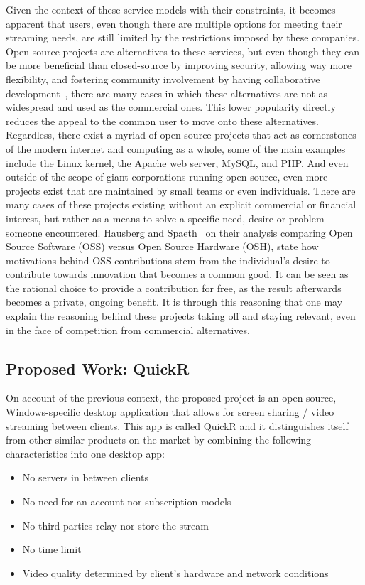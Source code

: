 \documentclass{article}
\begin{document}
Given the context of these service models with their constraints, it becomes apparent that users, even though there are multiple options for meeting their streaming needs, are still limited by the restrictions imposed
by these companies. Open source projects are alternatives to these services, but even though they can be more beneficial than closed-source by improving security, allowing way more flexibility, and fostering
community involvement by having collaborative development~\cite{open_source_benefits}, there are many cases in which these alternatives are not as widespread and used as the commercial ones. This lower popularity directly reduces the appeal to the 
common user to move onto these alternatives. Regardless, there exist a myriad of open source projects that act as cornerstones of the modern internet and computing as a whole, some of the main examples include the Linux kernel, the Apache web server, MySQL, and PHP.  And even outside of the scope of giant corporations running open source, even more projects exist that are maintained by small teams or even individuals.
There are many cases of these projects existing without an explicit commercial or financial interest, but rather as a means to solve a specific need, desire or problem someone encountered. Hausberg and Spaeth~\cite{hausberg2020open} on their analysis comparing Open Source Software (OSS) versus Open Source Hardware (OSH), state how
motivations behind OSS contributions stem from the individual's desire to contribute towards innovation that becomes a common good. It can be seen as the rational choice to provide a contribution for free, as the result afterwards becomes
a private, ongoing benefit. It is through this reasoning that one may explain the reasoning behind these projects taking off and staying relevant, even in the face of competition from commercial alternatives.

\subsection{Proposed Work: QuickR}
On account of the previous context, the proposed project is an open-source, Windows-specific desktop application that allows for screen sharing / video streaming between clients. This app is called QuickR and it distinguishes itself from other similar products on the market by 
combining the following characteristics into one desktop app:

\begin{itemize}
    \item No servers in between clients
    \item No need for an account nor subscription models
    \item No third parties relay nor store the stream
    \item No time limit
    \item Video quality determined by client's hardware and network conditions
\end{itemize}
\end{document}
